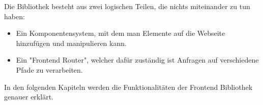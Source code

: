 Die Bibliothek besteht aus zwei logischen Teilen, die nichts miteinander zu tun haben:
\begin{itemize}
    \item Ein Komponentensystem, mit dem man Elemente auf die Webseite hinzufügen und manipulieren kann. 
    \item Ein "Frontend Router", welcher dafür zuständig ist Anfragen auf verschiedene Pfade zu verarbeiten.
\end{itemize}

In den folgenden Kapiteln werden die Funktionalitäten der Frontend Bibliothek genauer erklärt.
